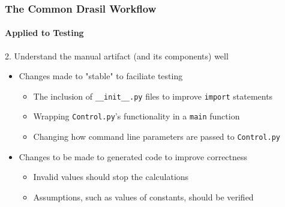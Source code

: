 \documentclass{beamer}
\begin{document}
\begin{frame}
    \frametitle{The Common Drasil Workflow}
    \framesubtitle{Applied to Testing}

    2. Understand the manual artifact (and its components) well
    \begin{itemize}
        \item<2-> Changes made to "stable" to faciliate testing
              \begin{itemize}
                  \item The inclusion of \texttt{\_\_init\_\_.py} files to
                        improve \texttt{import} statements
                  \item Wrapping \texttt{Control.py}'s functionality in a
                        \texttt{main} function
                  \item Changing how command line parameters are
                        passed to \texttt{Control.py}
              \end{itemize}
        \item<3-> Changes to be made to generated code to improve correctness
              \begin{itemize}
                  \item Invalid values should stop the calculations
                        \cite{projectile_current}
                  \item Assumptions, such as values of constants, should be
                        verified
              \end{itemize}
    \end{itemize}

\end{frame}
\end{document}
